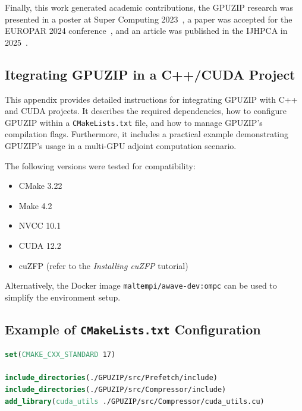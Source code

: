 \documentclass[Ingles,Final]{ic-tese-v3}
\begin{document}
Finally, this work generated academic contributions, the GPUZIP research was presented in a poster at Super Computing 2023~\cite{sc23}, a paper was accepted for the EUROPAR 2024 conference~\cite {europar}, and an article was published in the IJHPCA in 2025~\cite{ijhpca}.






\begin{appendices}{}
\chapter{Itegrating GPUZIP in a C++/CUDA Project}
\label{appendix:gpuzip}

This appendix provides detailed instructions for integrating GPUZIP with C++ and CUDA projects. It describes the required dependencies, how to configure GPUZIP within a \texttt{CMakeLists.txt} file, and how to manage GPUZIP's compilation flags. Furthermore, it includes a practical example demonstrating GPUZIP's usage in a multi-GPU adjoint computation scenario.

The following versions were tested for compatibility:

\begin{itemize}
    \item CMake 3.22
    \item Make 4.2
    \item NVCC 10.1
    \item CUDA 12.2
    \item cuZFP (refer to the \textit{Installing cuZFP} tutorial)
\end{itemize}

Alternatively, the Docker image \texttt{maltempi/awave-dev:ompc} can be used to simplify the environment setup.

\section{Example of \texttt{CMakeLists.txt} Configuration}

\begin{lstlisting}[language=CMake, caption={Example of CMake configuration to include GPUZIP}, label={lst:cmake}]
set(CMAKE_CXX_STANDARD 17)

include_directories(./GPUZIP/src/Prefetch/include)
include_directories(./GPUZIP/src/Compressor/include)
add_library(cuda_utils ./GPUZIP/src/Compressor/cuda_utils.cu)


\end{lstlisting}
\end{appendices}
\end{document}
